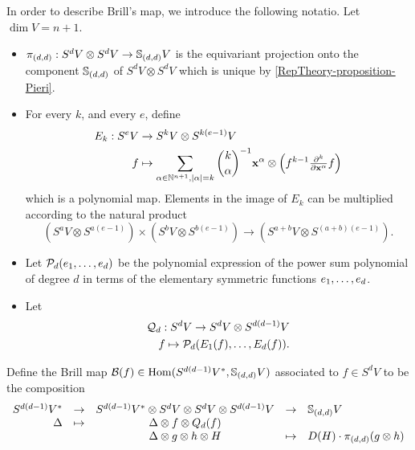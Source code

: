 In order to describe Brill's map, we introduce the following notatio. Let $\dim V = n+1$.
\begin{itemize}
 \item $\pi_{(d,d)}: S^d V \otimes S^d V \to \mathbb{S}_{(d,d)} V$ is the equivariant projection onto the component $ \mathbb{S}_{(d,d)}$ of $S^d V \otimes S^d V$ which is unique by \ref{RepTheory-proposition-Pieri}.
 \item For every $k$, and every $e$, define
 \[
 \begin{aligned}
 E_k : S^e V &\to S^{k} V \otimes S^{k(e-1)}V  \\
 f &\mapsto \sum_{\alpha \in \mathbb{N}^{n+1}, |\alpha| = k} \binom{k}{\alpha}^{-1} \mathbf{x}^\alpha \otimes \left( f^{k-1}\textstyle \frac{\partial^k}{\partial \mathbf{x}^\alpha} f \right)
\end{aligned}
 \]
 which is a polynomial map. Elements in the image of $E_k$ can be multiplied according to the natural product 
 \[
( S^a V \otimes S^{a(e-1)} ) \times ( S^b V \otimes S^{b(e-1)} )  \to ( S^{a+b} V \otimes S^{(a+b)(e-1)} ).
\]
 \item Let $\mathcal{P}_d ( e_1 , \ldots , e_d)$ be the polynomial expression of the power sum polynomial of degree $d$ in terms of the elementary symmetric functions $e_1 , \ldots , e_d$. 
 \item Let 
 \[
 \begin{aligned}
 \mathcal{Q}_{d} : S^d V \to S^d V \otimes S^{d(d-1)}V \\
 f \mapsto \mathcal{P}_d ( E_1(f) , \ldots , E_d(f)).
 \end{aligned}
 \]
\end{itemize}
Define the Brill map $\mathcal{B}(f) \in \operatorname{Hom} ( S^{d(d-1)}V^* , \mathbb{S}_{(d,d)} V)$ associated to $f \in S^d V$ to be the composition
\[
\begin{array}{rcccl}
S^{d(d-1)}V^* &\to & S^{d(d-1)}V^* \otimes S^d V \otimes S^d V \otimes S^{d(d-1)} V & \to & \mathbb{S}_{(d,d)} V \\
\Delta &\mapsto &\Delta \otimes f \otimes Q_d(f)  & &\\
& & \Delta \otimes g \otimes h \otimes H &\mapsto & D(H) \cdot \pi_{(d,d)} (g \otimes h)
\end{array}
 \]




